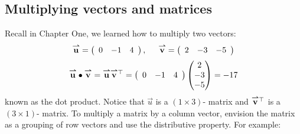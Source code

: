 \documentclass{ximera}
\begin{document}
\subsection{Multiplying vectors and matrices}
Recall in Chapter One, we learned how to multiply two vectors:
\[\vec{u}= \left(\begin{array}{ccc}
0 & -1 & 4
\end{array}\right), \hspace{.5cm} \vec{v} = \left(\begin{array}{ccc}
2 & -3 & -5
\end{array}\right)
\]
\[
\vec{u}\dotp \vec{v} = \vec{u} \vec{v}^{\transpose} = \left(\begin{array}{ccc} 
0 & -1 & 4
\end{array}\right)
\begin{pmatrix}
2\\
-3\\
-5
\end{pmatrix}
= -17
\]
known as the dot product. Notice that $\vec{u}$ is a $\left(1\times 3\right)$- matrix and $\vec{v}^{\transpose}$ is a $\left(3\times 1\right)$- matrix. To multiply a matrix by a column vector, envision the matrix as a
grouping of row vectors and use the distributive property. For
example:
\end{document}
